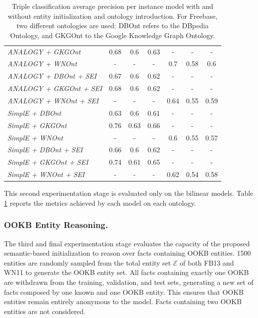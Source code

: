 \begin{table}
{\begin{tabular}{l|c|c|c|c|c|c|}
\multicolumn{1}{|l|}{\textit{ANALOGY + GKGOnt}}                          & 0.68  & 0.6    & 0.63     & -     & -      & -        \\
\multicolumn{1}{|l|}{\textit{ANALOGY + WNOnt}}                           & -     & -      & -        & 0.7   & 0.58   & 0.6      \\
\multicolumn{1}{|l|}{\textit{ANALOGY + DBOnt + SEI}}   & 0.67  & 0.6    & 0.62     & -     & -      & -        \\
\multicolumn{1}{|l|}{\textit{ANALOGY + GKGOnt + SEI}}  & 0.68  & 0.6    & 0.62     & -     & -      & -        \\
\multicolumn{1}{|l|}{\textit{ANALOGY + WNOnt + SEI}}   & -     & -      & -        & 0.64  & 0.55   & 0.59     \\ \hline
\multicolumn{1}{|l|}{\textit{SimplE + DBOnt}}                            & 0.63  & 0.6    & 0.61     & -     & -      & -        \\
\multicolumn{1}{|l|}{\textit{SimplE + GKGOnt}}                           & 0.76  & 0.63   & 0.66     & -     & -      & -        \\
\multicolumn{1}{|l|}{\textit{SimplE + WNOnt}}                            & -     & -      & -        & 0.6   & 0.55   & 0.57     \\
\multicolumn{1}{|l|}{\textit{SimplE + DBOnt + SEI}}    & 0.66  & 0.6    & 0.62     & -     & -      & -        \\
\multicolumn{1}{|l|}{\textit{SimplE + GKGOnt + SEI}}   & 0.74  & 0.61   & 0.65     & -     & -      & -        \\
\multicolumn{1}{|l|}{\textit{SimplE + WNOnt + SEI}}    & -     & -      & -        & 0.62  & 0.54   & 0.58     \\ \hline
\end{tabular}
}
\caption{Triple classification average precision per instance model with and without entity initialization and ontology introduction. For Freebase, two different ontologies are used: DBOnt refers to the DBpedia Ontology, and GKGOnt to the Google Knowledge Graph Ontology.}
\label{tab:exp_ont_intro}
\end{table}

This second experimentation stage is evaluated only on the bilinear models. Table \ref{tab:exp_ont_intro} reports the metrics achieved by each model on each ontology.

\subsubsection{OOKB Entity Reasoning.}
The third and final experimentation stage evaluates the capacity of the proposed semantic-based initialization to reason over facts containing OOKB entities. 1500 entities are randomly sampled from the total entity set $\mathcal{E}$ of both FB13 and WN11 to generate the OOKB entity set. All facts containing exactly one OOKB are withdrawn from the training, validation, and test sets, generating a new set of facts composed by one known and one OOKB entity. This ensures that OOKB entities remain entirely anonymous to the model. Facts containing two OOKB entities are not considered.

